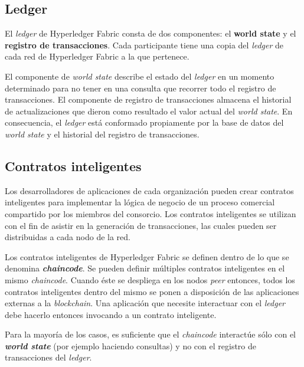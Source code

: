 
\subsection{Ledger}

El \textit{ledger} de Hyperledger Fabric consta de dos componentes: el \textbf{world state} y el \textbf{registro de transacciones}. Cada participante tiene una copia del \textit{ledger} de cada red de Hyperledger Fabric a la que pertenece.

El componente de \textit{world state} describe el estado del \textit{ledger} en un momento determinado para no tener en una consulta que recorrer todo el registro de transacciones. El componente de registro de transacciones almacena el historial de actualizaciones que dieron como resultado el valor actual del \textit{world state}. En consecuencia, el \textit{ledger} está conformado propiamente por la base de datos del \textit{world state} y el historial del registro de transacciones.

\subsection{Contratos inteligentes}

Los desarrolladores de aplicaciones de cada organización pueden crear contratos inteligentes para implementar la lógica de negocio de un proceso comercial compartido por los miembros del consorcio. Los contratos inteligentes se utilizan con el fin de asistir en la generación de transacciones, las cuales pueden ser distribuidas a cada nodo de la red.

Los contratos inteligentes de Hyperledger Fabric se definen dentro de lo que se denomina \textbf{\textit{chaincode}}. Se pueden definir múltiples contratos inteligentes en el mismo \textit{chaincode}. Cuando éste se despliega en los nodos \textit{peer} entonces, todos los contratos inteligentes dentro del mismo se ponen a disposición de  las aplicaciones externas a la \textit{blockchain}. Una aplicación que necesite interactuar con el \textit{ledger} debe hacerlo entonces invocando a un  contrato inteligente. 

Para la mayoría de los casos, es suficiente que el \textit{chaincode} interactúe sólo con el \textbf{\textit{world state}} (por ejemplo haciendo consultas) y no con el registro de transacciones del \textit{ledger}.

